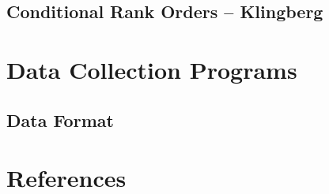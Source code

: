 \documentclass[
  12pt,
]{article}
\begin{document}
\subsection{Conditional Rank Orders -- Klingberg}\label{conditional-rank-orders-klingberg}

\section{Data Collection Programs}\label{data-collection-programs}

\subsection{Data Format}\label{data-format}

\section*{References}\label{references}
\end{document}
